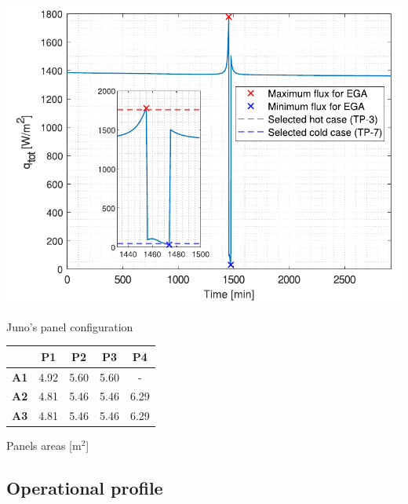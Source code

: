 \begin{minipage}{0.5\linewidth}
    \centering
    \captionsetup{type=figure}
    \includegraphics[width=\linewidth]{Images/EGA_flux_analysis.pdf}
    \caption{Juno's panel configuration}
    \label{fig:panel_config}
\end{minipage}\hfill
\begin{minipage}{0.5\linewidth}
    \centering
    \captionsetup{type=table}
    \renewcommand{\arraystretch}{1.4}
    \begin{tabular}{|c|c|c|c|c|}
        \hline
        &  \textbf{P1}  & \textbf{P2} & \textbf{P3} & \textbf{P4}\\
        \hline
        \hline
        \textbf{A1}      & 4.92 & 5.60 & 5.60 & - \\
        \hline
        \textbf{A2}      & 4.81 & 5.46 & 5.46 & 6.29  \\
        \hline
        \textbf{A3}     & 4.81 & 5.46 & 5.46 & 6.29  \\
        \hline
    \end{tabular}
    \caption{Panels areas [m$^2$]}
    \label{table:panels_area}
\end{minipage}



\subsection{Operational profile}
\label{subsec:operational_profile}
